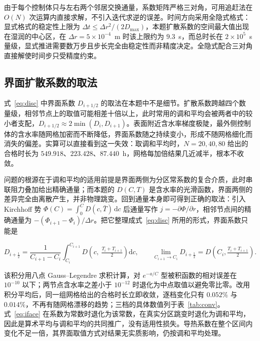 由于每个控制体只与左右两个邻居交换通量，系数矩阵严格三对角，可用追赶法在 $O(N)$ 次运算内直接求解，不引入迭代求逆的误差。时间方向采用全隐式格式：显式格式的稳定性上限为 $\Delta t\le\Delta r^2/(2D_{\max})$，本题扩散系数的空间最大值出现在湿润的中心区，在 $\Delta r=5\times10^{-4}$~m 时该上限约为 $9.3$~s，而总时长在 $2\times10^5$~s 量级，显式推进需要数万步且步长完全由稳定性而非精度决定。全隐式配合三对角直接解使时间步只受精度约束。

\subsection{界面扩散系数的取法}

式~\eqref{eq:disc} 中界面系数 $D_{i+1/2}$ 的取法在本题中不是细节。扩散系数跨越四个数量级，相邻节点上的取值可能相差十倍以上，此时常用的调和平均会被两者中的较小者支配，$D_{i+1/2}\approx2\min(D_i,D_{i+1})$。表面附近含水率梯度极陡，最外侧控制体的含水率随网格加密而不断降低，界面系数随之持续变小，形成不随网格细化而消失的偏差。实算可以直接看到这一失效：取调和平均时，$N=20,40,80$ 给出的合格时长为 $549.918$、$223.428$、$87.440$~h，网格每加倍结果几近减半，根本不收敛。

问题的根源在于调和平均的适用前提是界面两侧为分区常系数的复合介质，此时串联阻力叠加给出精确通量；而本题的 $D(C,T)$ 是含水率的光滑函数，界面两侧的差异完全由离散产生，并非物理跳变。回到通量本身即可得到正确的取法：引入 Kirchhoff 势 $\Phi(C)=\int_0^C D(c,\bar T)\,\mathrm{d}c$ 后通量写作 $j=-\partial\Phi/\partial r$，相邻节点间的精确通量为 $-(\Phi_{i+1}-\Phi_i)/\Delta r$。把它整理成式~\eqref{eq:disc} 所用的形式，界面系数只能是

\begin{equation}
D_{i+\frac12}=\frac{1}{C_{i+1}-C_i}\int_{C_i}^{C_{i+1}} D\!\left(c,\ \tfrac{T_i+T_{i+1}}{2}\right)\mathrm{d}c ,
\qquad
\lim_{C_{i+1}\to C_i}D_{i+\frac12}=D\!\left(C_i,\tfrac{T_i+T_{i+1}}{2}\right).
\label{eq:iface}
\end{equation}

该积分用八点 Gauss--Legendre 求积计算，对 $e^{-a/C}$ 型被积函数的相对误差在 $10^{-10}$ 以下；两节点含水率之差小于 $10^{-12}$ 时退化为中点取值以避免零比零。改用积分平均后，同一组网格给出的合格时长立即收敛，逐档变化只有 $0.052\%$ 与 $0.014\%$，不再有随网格漂移的趋势；三档的具体数值列于表~\ref{tab:conv}。式~\eqref{eq:iface} 在系数为常数时退化为该常数，在真实分区跳变时退化为调和平均，因此是算术平均与调和平均的共同推广，没有适用性损失。导热系数在整个区间内变化不足一倍，其界面取值方式对结果无实质影响，仍按调和平均处理。

